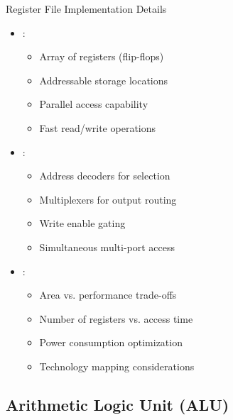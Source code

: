 \begin{frame}{Register File Implementation Details}
\begin{itemize}
\item {}:
\begin{itemize}
\item Array of registers (flip-flops)
\item Addressable storage locations
\item Parallel access capability
\item Fast read/write operations
\end{itemize}
\vspace{0.5cm}
\item {}:
\begin{itemize}
\item Address decoders for selection
\item Multiplexers for output routing
\item Write enable gating
\item Simultaneous multi-port access
\end{itemize}
\vspace{0.3cm}
\item {}:
\begin{itemize}
\item Area vs. performance trade-offs
\item Number of registers vs. access time
\item Power consumption optimization
\item Technology mapping considerations
\end{itemize}
\end{itemize}
\end{frame}

\subsection{Arithmetic Logic Unit (ALU)}


